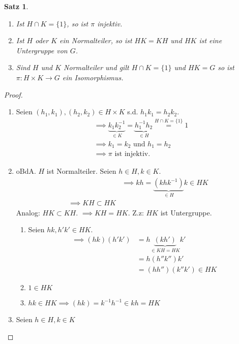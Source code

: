 \documentclass{article}
\theoremstyle{plain}
\newtheorem{theorem}{Satz}
\begin{document}
\begin{theorem}
    \begin{enumerate}[label=(\alph*)]
        \item Ist $H\cap K=\{1\}$, so ist $\pi$ injektiv.
        \item Ist $H$ oder $K$ ein Normalteiler, so ist $HK=KH$ und $HK$ ist eine Untergruppe von $G$.
        \item Sind $H$ und $K$ Normalteiler und gilt $H\cap K=\{1\}$ und $HK=G$ so ist $\pi\colon H\times K\to G$ ein Isomorphismus.
    \end{enumerate}
\end{theorem}
\begin{proof}
    \begin{enumerate}[label=(\alph*)]
        \item Seien $(h_1,k_1),(h_2,k_2)\in H\times K$ s.d. $h_1k_1=h_2k_2$. 
        \begin{align*}
        &\implies \underbrace{k_1k_2^{-1}}_{\in K}=\underbrace{h_1^{-1}h_2}_{\in H}\overset{H\cap K =\{1\}}{=}1\\
        &\implies k_1=k_2 \text{ und } h_1=h_2\\
        &\implies \pi \text{ ist injektiv}.
        \end{align*}
        \item oBdA. $H$ ist Normalteiler. Seien $h\in H, k\in K$.
        \begin{align*}
            &\implies kh=\underbrace{(khk^{-1})}_{\in H}k\in HK\\
            \implies KH\subset HK
        \end{align*}
        Analog: $HK\subset KH$.
        $\implies KH=HK$.
        Z.z: $HK$ ist Untergruppe.
        \begin{enumerate}[label=(\roman*)]
            \item Seien $hk, h'k'\in HK$. 
            \begin{align*}
                \implies (hk)(h'k')&=h\underbrace{(kh')}_{\in KH=HK}k'\\
                &= h(h''k'')k'\\
                &=(hh'')(k''k')\in HK
            \end{align*}
            \item $1\in HK$
            \item $hk\in HK\implies (hk)=k^{-1}h^{-1}\in kh=HK$
        \end{enumerate}
        \item Seien $h\in H, k\in K$

\end{enumerate}
\end{proof}
\end{document}

